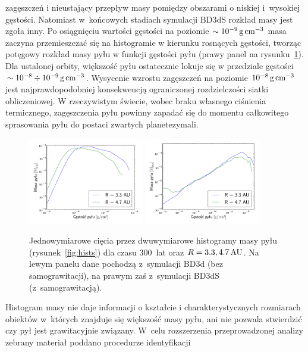 zagęszczeń i nieustający przepływ masy pomiędzy obszarami o niskiej i~wysokiej
gęstości. Natomiast w~końcowych stadiach symulacji BD3dS rozkład masy jest zgoła
inny. Po osiągnięciu wartości gęstości na poziomie $\sim10^{-9}\hbox{$\thinspace\textrm{g}$}\hbox{$\thinspace\textrm{cm}$}^{-3}$ masa
zaczyna przemieszczać się na histogramie w kierunku rosnących gęstości, tworząc
potęgowy rozkład masy pyłu w funkcji gęstości pyłu (prawy panel na
rysunku~\ref{fig:hists1d}). Dla ustalonej orbity, większość pyłu ostatecznie
lokuje się w przedziale gęstości $\sim10^{-8}\div10^{-9}\hbox{$\thinspace\textrm{g}$}\hbox{$\thinspace\textrm{cm}$}^{-3}$.  Wysycenie
wzrostu zagęszczeń na poziomie $10^{-8}\hbox{$\thinspace\textrm{g}$}\hbox{$\thinspace\textrm{cm}$}^{-3}$ jest najprawdopodobniej
konsekwencją ograniczonej rozdzielczości siatki obliczeniowej. W rzeczywistym
świecie, wobec braku własnego ciśnienia termicznego, zagęszczenia pyłu powinny
zapadać się do momentu całkowitego sprasowania pyłu do postaci zwartych
planetezymali.
%
\begin{figure} 
  \centering
  \includegraphics[width=0.45\textwidth]{figures/hist1d_nosg}
  \includegraphics[width=0.45\textwidth]{figures/hist1d_sg}
  \caption{Jednowymiarowe cięcia przez dwuwymiarowe histogramy masy pyłu
  (rysunek~\ref{fig:hists}) dla czasu 300~lat oraz $R = 3.3, 4.7\hbox{$\thinspace\textrm{AU}$}$. Na lewym
  panelu dane pochodzą z~symulacji BD3d (bez samograwitacji), na prawym zaś
  z~symulacji BD3dS (z~samograwitacją).}
  \label{fig:hists1d} 
\end{figure}
%
\par Histogram masy nie daje informacji o kształcie i charakterystycznych
rozmiarach obiektów w~których znajduje się większość masy pyłu, ani nie pozwala
stwierdzić czy pył jest grawitacyjnie związany. W~celu rozszerzenia
przeprowadzonej analizy zebrany materiał poddano procedurze identyfikacji
